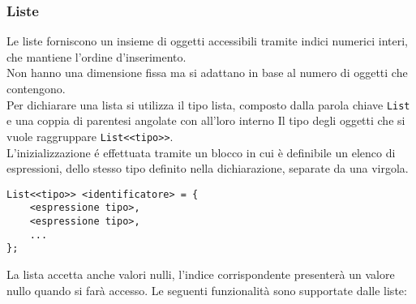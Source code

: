 \subsubsection{Liste}
Le liste forniscono un insieme di oggetti accessibili tramite indici numerici interi, che mantiene l'ordine d'inserimento. \cite{CSharpLang} \\
Non hanno una dimensione fissa ma si adattano in base al numero di oggetti che contengono. \\
Per dichiarare una lista si utilizza il tipo lista, composto dalla parola chiave 
\lstinline|List| e una coppia di parentesi angolate con all'loro interno Il tipo degli 
oggetti che si vuole raggruppare \lstinline|List<<tipo>>|. \\
L'inizializzazione é effettuata tramite un blocco in cui è definibile un elenco di 
espressioni, dello stesso tipo definito nella dichiarazione, separate da una virgola.
\begin{lstlisting}
List<<tipo>> <identificatore> = {
    <espressione tipo>,
    <espressione tipo>,
    ...
};
\end{lstlisting}
La lista accetta anche valori nulli, l'indice corrispondente presenterà un valore nullo quando si farà accesso. 
Le seguenti funzionalità sono supportate dalle liste: 
